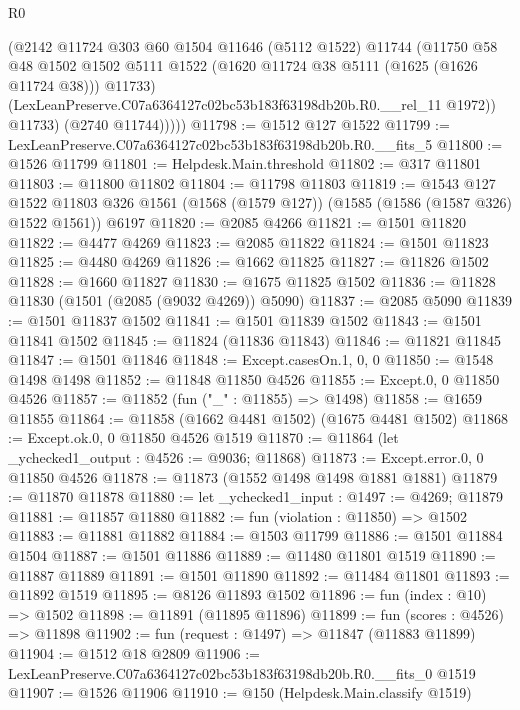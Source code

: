 \begin{lexlean}{R0}
\begin{coremodule}
              (@2142
                @11724
                @303
                @60
                @1504
                @11646
                (@5112 @1522)
                @11744
                (@11750
                  @58
                  @48
                  @1502
                  @1502
                  @5111
                  @1522
                  (@1620 @11724 @38 @5111 (@1625 (@1626 @11724 @38)))
                  @11733)
                (LexLeanPreserve.C07a6364127c02bc53b183f63198db20b.R0.__rel_11 @1972))
              @11733)
            (@2740 @11744)))))
@11798 := @1512 @127 @1522
@11799 := LexLeanPreserve.C07a6364127c02bc53b183f63198db20b.R0.__fits_5
@11800 := @1526 @11799
@11801 := Helpdesk.Main.threshold
@11802 := @317 @11801
@11803 := @11800 @11802
@11804 := @11798 @11803
@11819 := @1543
    @127
    @1522
    @11803
    @326
    @1561
    (@1568 (@1579 @127))
    (@1585 (@1586 (@1587 @326) @1522 @1561))
    @6197
@11820 := @2085 @4266
@11821 := @1501 @11820
@11822 := @4477 @4269
@11823 := @2085 @11822
@11824 := @1501 @11823
@11825 := @4480 @4269
@11826 := @1662 @11825
@11827 := @11826 @1502
@11828 := @1660 @11827
@11830 := @1675 @11825 @1502
@11836 := @11828 @11830 (@1501 (@2085 (@9032 @4269)) @5090)
@11837 := @2085 @5090
@11839 := @1501 @11837 @1502
@11841 := @1501 @11839 @1502
@11843 := @1501 @11841 @1502
@11845 := @11824 (@11836 @11843)
@11846 := @11821 @11845
@11847 := @1501 @11846
@11848 := Except.casesOn.{1, 0, 0}
@11850 := @1548 @1498 @1498
@11852 := @11848 @11850 @4526
@11855 := Except.{0, 0} @11850 @4526
@11857 := @11852 (fun ("_" : @11855) => @1498)
@11858 := @1659 @11855
@11864 := @11858 (@1662 @4481 @1502) (@1675 @4481 @1502)
@11868 := Except.ok.{0, 0} @11850 @4526 @1519
@11870 := @11864 (let _ychecked1_output : @4526 := @9036; @11868)
@11873 := Except.error.{0, 0} @11850 @4526
@11878 := @11873 (@1552 @1498 @1498 @1881 @1881)
@11879 := @11870 @11878
@11880 := let _ychecked1_input : @1497 := @4269; @11879
@11881 := @11857 @11880
@11882 := fun (violation : @11850) => @1502
@11883 := @11881 @11882
@11884 := @1503 @11799
@11886 := @1501 @11884 @1504
@11887 := @1501 @11886
@11889 := @11480 @11801 @1519
@11890 := @11887 @11889
@11891 := @1501 @11890
@11892 := @11484 @11801
@11893 := @11892 @1519
@11895 := @8126 @11893 @1502
@11896 := fun (index : @10) => @1502
@11898 := @11891 (@11895 @11896)
@11899 := fun (scores : @4526) => @11898
@11902 := fun (request : @1497) => @11847 (@11883 @11899)
@11904 := @1512 @18 @2809
@11906 := LexLeanPreserve.C07a6364127c02bc53b183f63198db20b.R0.__fits_0 @1519
@11907 := @1526 @11906
@11910 := @150 (Helpdesk.Main.classify @1519)

\end{coremodule}
\end{lexlean}
